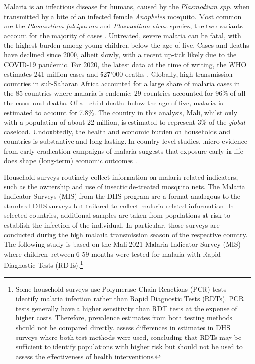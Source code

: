 Malaria is an infectious disease for humans, caused by the \textit{Plasmodium spp.} when transmitted by a bite of an infected female \textit{Anopheles} mosquito. Most common are the \textit{Plasmodium falciparum} and \textit{Plasmodium vivax} species, the two variants account for the majority of cases \autocite{phillipsMalaria2017}. Untreated, severe malaria can be fatal, with the highest burden among young children below the age of five. Cases and deaths have declined since 2000, albeit slowly, with a recent up-tick likely due to the COVID-19 pandemic. For 2020, the latest data at the time of writing, the WHO estimates 241 million cases and 627'000 deaths \autocite{worldhealthorganizationWorldMalariaReport2021}. Globally, high-transmission countries in sub-Saharan Africa accounted for a large share of malaria cases in the 85 countries where malaria is endemic: 29 countries accounted for 96\% of all the cases and deaths. Of all child deaths below the age of five, malaria is estimated to account for 7.8\%. The country in this analysis, Mali, whilst only with a population of about 22 million, is estimated to represent 3\% of the \textit{global} caseload. Undoubtedly, the health and economic burden on households and countries is substantive and long-lasting. In country-level studies, micro-evidence from early eradication campaigns of malaria suggests that exposure early in life does shape (long-term) economic outcomes \autocite{bleakleyMalariaEradicationAmericas2010, cutlerEarlyLifeMalariaExposure2010, lucasMalariaEradicationEducational2010, hongMalariaEconomicProductivity2011}. 

Household surveys routinely collect information on malaria-related indicators, such as the ownership and use of insecticide-treated mosquito nets. The Malaria Indicator Surveys (MIS) from the DHS program are a format analogous to the standard DHS surveys but tailored to collect malaria-related information. In selected countries, additional samples are taken from populations at risk to establish the infection of the individual. In particular, those surveys are conducted during the high malaria transmission season of the respective country. The following study is based on the Mali 2021 Malaria Indicator Survey (MIS) where children between 6-59 months were tested for malaria with Rapid Diagnostic Tests (RDTs).\footnote{Some household surveys use Polymerase Chain Reactions (PCR) tests identify malaria infection rather than Rapid Diagnostic Tests (RDTs). PCR tests generally have a higher sensitivity than RDT tests at the expense of higher costs. Therefore, prevalence estimates from both testing methods should not be compared directly. \textcite{floreyMeasuresMalariaParasitemia2014} assess differences in estimates in DHS surveys where both test methods were used, concluding that RDTs may be sufficient to identify populations with higher risk but should not be used to assess the effectiveness of health interventions.} 

